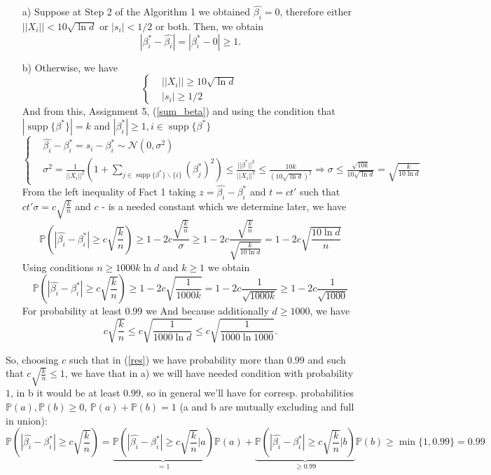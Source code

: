 \documentclass[]{article}
\DeclareMathOperator\supp{supp}
\begin{document}
\begin{enumerate}
	\item[a)] Suppose at Step 2 of the Algorithm 1 we obtained $\hat{\beta_i}=0$, therefore either $||X_i|| < 10\sqrt{\ln d}$ or $|s_i| < 1/2$ or both. Then, we obtain 
$$
|\beta_i^* - \hat{\beta_i}| = |\beta_i^* - 0| \ge 1.$$

\item[b)] Otherwise, we have 
$$\begin{cases}
&||X_i|| \ge 10\sqrt{\ln d}\\
&|s_i| \ge 1/2
\end{cases}
$$
And from this, Assignment 5, (\ref{sum_beta}) and using the condition that $|\supp\{\beta^*\}|=k$ and $|\beta_i^*|\ge 1, i\in\supp\{\beta^*\}$
$$
\begin{cases}
& \hat{\beta_i} -  \beta_i^* = s_i - \beta_i^* \sim\mathcal{N}(0, \sigma^2)\\
&\sigma^2= \frac{1}{||X_i||^2}\left(1+\sum_{j\in\supp\{\beta^*\}\backslash \{i\}}(\beta_j^*)^2\right)
\le \frac{||\beta^*||^2}{||X_i||^2}
\le \frac{10k}{(10\sqrt{\ln{d}})^2} 
\Rightarrow \sigma
\le\frac{\sqrt{10k}}{10\sqrt{\ln{d}}}=\sqrt{\frac{k}{10\ln{d}}}
\end{cases}
$$
From the left inequality of Fact 1 taking $z=\hat{\beta_i} -  \beta_i^*$ and $t=ct'$ such that $ct'\sigma=c\sqrt{\frac{k}{n}}$ and $c$ - is a needed constant which we determine later, we have 
\begin{equation}
\mathbb{P}\left(|\hat{\beta_i} -  \beta_i^*| \ge c\sqrt{\frac{k}{n}}\right) 
\ge 1 - 2c\frac{\sqrt{\frac{k}{n}}}{\sigma}
\ge 1-2c\frac{\sqrt{\frac{k}{n}}}{\sqrt{\frac{k}{10\ln{d}}}} = 1-2c\sqrt{\frac{10\ln{d}}{n}}
\end{equation}
Using conditions $n\ge1000 k \ln{d}$ and $k\ge 1$ we obtain
\begin{equation}
\mathbb{P}\left(|\hat{\beta_i} -  \beta_i^*|\ge c\sqrt{\frac{k}{n}}\right) \ge 1-2c\sqrt{\frac{1}{1000k}}=1-2c\frac{1}{\sqrt{1000k}}
\ge 1-2c\frac{1}{\sqrt{1000}}
\label{res}
\end{equation}
For probability at least 0.99 we 
And because additionally $d\ge 1000$, we have 
\begin{equation}
c\sqrt{\frac{k}{n}}\le c\sqrt{\frac{1}{1000\ln{d}}}\le c\sqrt{\frac{1}{1000\ln{1000}}}.
\end{equation}
\end{enumerate}
So, choosing $c$ such that in (\ref{res}) we have probability more than $0.99$ and such that $c\sqrt{\frac{k}{n}}\le1$, we have that in a) we will have needed condition with probability $1$, in b it would be at least $0.99$, so in general we'll have for corresp. probabilities $\mathbb{P}(a), \mathbb{P}(b) \ge 0$, $\mathbb{P}(a)+\mathbb{P}(b)=1$ (a and b are mutually excluding and full in union):
$$\mathbb{P}\left(|\hat{\beta_i} -  \beta_i^*|\ge c\sqrt{\frac{k}{n}}\right)=
\underbrace{\mathbb{P}\left(|\hat{\beta_i} -  \beta_i^*|\ge c\sqrt{\frac{k}{n}}\bigg\vert a\right)
}_{=1}\mathbb{P}(a) 
+ \underbrace{\mathbb{P}\left(|\hat{\beta_i} -  \beta_i^*|\ge c\sqrt{\frac{k}{n}}\bigg\vert b\right)}_{\ge 0.99}\mathbb{P}(b)\ge \min\{1, 0.99\} = 0.99$$
\end{document}
